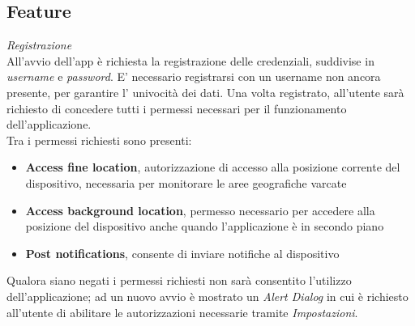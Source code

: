 \documentclass{article}
\begin{document}
    \newpage
    \subsection*{Feature}
    \textit{Registrazione} \vspace*{7pt}\\
    All'avvio dell'app è richiesta la registrazione delle credenziali, suddivise in \textit{username} e \textit{password}. E' necessario registrarsi con un username non ancora presente, per garantire l' univocità dei dati. Una volta registrato, all'utente sarà richiesto di concedere tutti i permessi necessari per il funzionamento dell'applicazione. \\
    Tra i permessi richiesti sono presenti:
    \begin{itemize}
        \renewcommand{\labelitemi}{-}
        \item \textbf{Access fine location}, autorizzazione di accesso alla posizione corrente del dispositivo, necessaria per monitorare le aree geografiche varcate
        \item \textbf{Access background location}, permesso necessario per accedere alla posizione del dispositivo anche quando l'applicazione è in secondo piano
        \item \textbf{Post notifications}, consente di inviare notifiche al dispositivo
    \end{itemize}
    Qualora siano negati i permessi richiesti non sarà consentito l'utilizzo dell'applicazione; ad un nuovo avvio è mostrato un \textit{Alert Dialog} in cui è richiesto all'utente di abilitare le autorizzazioni necessarie tramite \textit{Impostazioni}. \vspace*{7pt}\\
\end{document}
